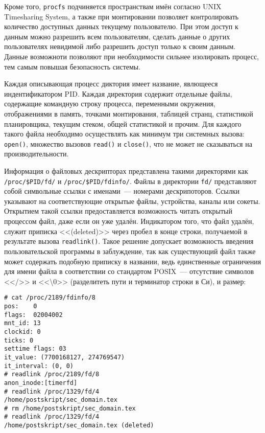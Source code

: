 Кроме того, \texttt{procfs} подчиняется пространствам имён согласно UNIX
Timesharing System, а также при монтировании позволяет контролировать количество
доступных данных текущему пользователю. При этом доступ к данным можно разрешить
всем пользователям, сделать данные о других пользователях невидимой либо
разрешить доступ только к своим данным. Данные возможноти позволяют при
необходимости сильнее изолировать процесс, тем самым повышая безопасность
системы.

Каждая описывающая процесс диктория имеет название, явлющееся индентификатором
PID\cite{understanding}. Каждая директория содержит отдельные файлы, содержащие
командную строку 
процесса, переменными окружения, отображениями в память, точками монтирования,
таблицей странц, статистикой планировщика, текущим стеком, общей статистикой и
прочим. Для каждого такого файла необходимо осуществлять как минимум три
системных вызова: \texttt{open()}, множество вызовов \texttt{read()} и
\texttt{close()}, что не может не сказываться на производительности.

Информация о файловых дескрипторах представлена такими директорями как
\texttt{/proc/\$PID/fd/} и \texttt{/proc/\$PID/fdinfo/}. Файлы в директории
\texttt{fd/} представляют собой символьные ссылки с именами~---
номерами дескрипоторов. Ссылки указывают на соответствующие открытые файлы,
устройства, каналы или сокеты. Открытием такой ссылки предоставляется
возможность читать открытый процессом файл, даже если он уже удалён. Индикатором
того, что файл удалён, служит приписка <<(deleted)>> через пробел в конце
строки, получаемой в результате вызова \texttt{readlink()}. Такое решение
допускает возможность введения пользовательской программы в
заблуждение\cite{johnson}, так как
существующий файл также может содержать подобную приписку в названии, ведь
единственные ограничения для имени файла в соответствии со стандартом POSIX~---
отсутствие символов <</>> и <<\textbackslash0>> (разделитеть пути и терминатор
строки в Си), и размер:

\medskip
\begin{lstlisting}[style=cstyle]
# cat /proc/2189/fdinfo/8
pos:    0
flags:  02004002
mnt_id: 13
clockid: 0
ticks: 0
settime flags: 03
it_value: (7700168127, 274769547)
it_interval: (0, 0)
# readlink /proc/2189/fd/8
anon_inode:[timerfd]
# readlink /proc/1329/fd/4
/home/postskript/sec_domain.tex
# rm /home/postskript/sec_domain.tex
# readlink /proc/1329/fd/4
/home/postskript/sec_domain.tex (deleted)
\end{lstlisting}
\medskip

